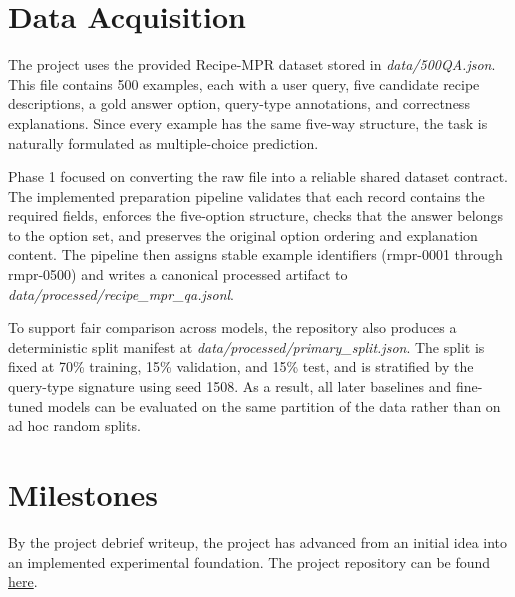 \documentclass{article}
\begin{document}
\section{Data Acquisition}
The project uses the provided Recipe-MPR dataset stored in \textit{data/500QA.json}. This file contains 500 examples, each with a user query, five candidate recipe descriptions, a gold answer option, query-type annotations, and correctness explanations. Since every example has the same five-way structure, the task is naturally formulated as multiple-choice prediction.

Phase 1 focused on converting the raw file into a reliable shared dataset contract. The implemented preparation pipeline validates that each record contains the required fields, enforces the five-option structure, checks that the answer belongs to the option set, and preserves the original option ordering and explanation content. The pipeline then assigns stable example identifiers (rmpr-0001 through rmpr-0500) and writes a canonical processed artifact to \textit{data/processed/recipe\_mpr\_qa.jsonl}.

To support fair comparison across models, the repository also produces a deterministic split manifest at \textit{data/processed/primary\_split.json}. The split is fixed at 70\% training, 15\% validation, and 15\% test, and is stratified by the query-type signature using seed 1508. As a result, all later baselines and fine-tuned models can be evaluated on the same partition of the data rather than on ad hoc random splits.


\section{Milestones}
By the project debrief writeup, the project has advanced from an initial idea into an implemented
experimental foundation. The project repository can be found \href{https://github.com/ShayanNasiri/ece1508}{here}. 
\end{document}
